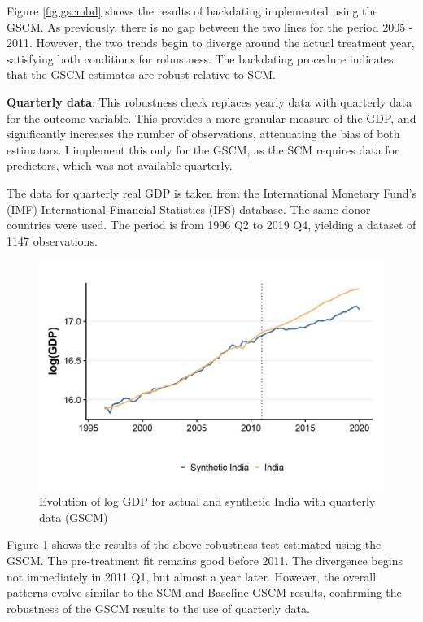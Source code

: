 \documentclass[12pt,nobind, a4paper]{reedthesis}
\begin{document}
 Figure \ref{fig:gscmbd} shows the results of backdating implemented using the GSCM. As previously, there is no gap between the two lines for the period 2005 - 2011. However, the two trends begin to diverge around the actual treatment year, satisfying both conditions for robustness. The backdating procedure indicates that the GSCM estimates are robust relative to SCM.
 \linebreak

 \textbf{Quarterly data}: This robustness check replaces yearly data with quarterly data for the outcome variable. This provides a more granular measure of the GDP, and significantly increases the number of observations, attenuating the bias of both estimators. I implement this only for the GSCM, as the SCM requires data for predictors, which was not available quarterly.
 \linebreak

 The data for quarterly real GDP is taken from the International Monetary Fund's (IMF) International Financial Statistics (IFS) database. The same donor countries were used. The period is from 1996 Q2 to 2019 Q4, yielding a dataset of 1147 observations.
 \begin{figure}

 {\centering \includegraphics[width=1\linewidth]{figure/indiagsynthqtr} 

 }

 \caption{Evolution of log GDP for actual and synthetic India with quarterly data (GSCM)}\label{fig:gqtr}
 \end{figure}
 Figure \ref{fig:gqtr} shows the results of the above robustness test estimated using the GSCM. The pre-treatment fit remains good before 2011. The divergence begins not immediately in 2011 Q1, but almost a year later. However, the overall patterns evolve similar to the SCM and Baseline GSCM results, confirming the robustness of the GSCM results to the use of quarterly data.
 \linebreak
\end{document}
